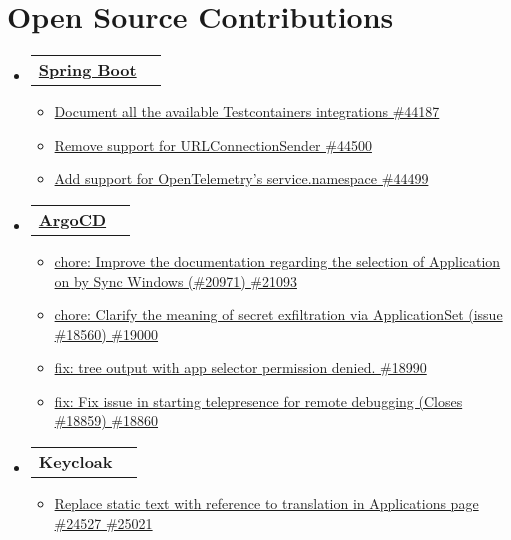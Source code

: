 \documentclass[a4paper,12pt]{article}
\makeatletter
\newcommand{\resumeItem}[1]{
	\item\small{
		{#1 \vspace{-2pt}}
	}
}
\newcommand{\resumeSubheadingSingleLine}[2]{
	\vspace{-2pt}\item
	\begin{tabular*}{0.97\textwidth}[t]{l@{\extracolsep{\fill}}r}
		\textbf{#1} & #2
	\end{tabular*}\vspace{-7pt}
}
\newcommand{\resumeSubHeadingListStart}{\begin{itemize}[leftmargin=0.15in, label={}]}
\newcommand{\resumeSubHeadingListEnd}{\end{itemize}}
\newcommand{\resumeItemListStart}{\begin{itemize}}
\newcommand{\resumeItemListEnd}{\end{itemize}\vspace{-5pt}}
\makeatother
\begin{document}
	\section{Open Source Contributions}
		\resumeSubHeadingListStart
			\resumeSubheadingSingleLine{ \href{https://github.com/spring-projects/spring-boot/pulls/thecooldrop}{Spring Boot}}{}{}{}
				\resumeItemListStart[label=]
					\resumeItem{\href{https://github.com/spring-projects/spring-boot/pull/44187}{Document all the available Testcontainers integrations \#44187}}
					\resumeItem{\href{https://github.com/spring-projects/spring-boot/pull/44500}{Remove support for URLConnectionSender \#44500}}
					\resumeItem{\href{https://github.com/spring-projects/spring-boot/pull/44499}{Add support for OpenTelemetry's service.namespace \#44499}}
				\resumeItemListEnd
			\resumeSubheadingSingleLine{ \href{https://github.com/argoproj/argo-cd/pulls/thecooldrop}{ArgoCD}}{}{}{}
				\resumeItemListStart[label=]
					\resumeItem{\href{https://github.com/argoproj/argo-cd/pull/21093}{chore: Improve the documentation regarding the selection of Application on by Sync Windows (\#20971) \#21093}}
					\resumeItem{\href{https://github.com/argoproj/argo-cd/pull/19000}{chore: Clarify the meaning of secret exfiltration via ApplicationSet (issue \#18560) \#19000}}
					\resumeItem{\href{https://github.com/argoproj/argo-cd/pull/18990}{fix: tree output with app selector permission denied. \#18990}}
					\resumeItem{\href{https://github.com/argoproj/argo-cd/pull/18860}{fix: Fix issue in starting telepresence for remote debugging (Closes \#18859) \#18860}}
				\resumeItemListEnd
			\resumeSubheadingSingleLine{ Keycloak}{}{}{}
				\resumeItemListStart[label=]
				\resumeItem{\href{https://github.com/keycloak/keycloak/pull/25021}{Replace static text with reference to translation in Applications page \#24527 \#25021}}
				\resumeItemListEnd
		\resumeSubHeadingListEnd
	
\end{document}
